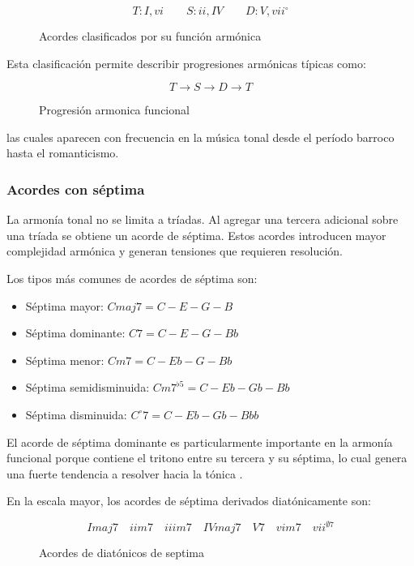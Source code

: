 \documentclass[12pt]{report}
\begin{document}
\begin{figure}[h]
\centering
\[
T: I, vi \qquad S: ii, IV \qquad D: V, vii^\circ
\]
\caption{Acordes clasificados por su función armónica \cite{harrison1994harmonic}}
\end{figure}


Esta clasificación permite describir progresiones armónicas típicas como:

\begin{figure}[h]
\centering
\[
T \rightarrow S \rightarrow D \rightarrow T
\]
\caption{Progresión armonica funcional \cite{rohrmeier2011generative}}
\end{figure}

las cuales aparecen con frecuencia en la música tonal desde el período barroco hasta el romanticismo.

\subsubsection{Acordes con séptima}

La armonía tonal no se limita a tríadas. Al agregar una tercera adicional sobre una tríada se obtiene un acorde de séptima. Estos acordes introducen mayor complejidad armónica y generan tensiones que requieren resolución.

Los tipos más comunes de acordes de séptima son:

\begin{itemize}
\item Séptima mayor: $Cmaj7 = C - E - G - B$
\item Séptima dominante: $C7 = C - E - G - Bb$
\item Séptima menor: $Cm7 = C - Eb - G - Bb$
\item Séptima semidisminuida: $Cm7^{\flat5} = C - Eb - Gb - Bb$
\item Séptima disminuida: $C^\circ7 = C - Eb - Gb - Bbb$
\end{itemize}

El acorde de séptima dominante es particularmente importante en la armonía funcional porque contiene el tritono entre su tercera y su séptima, lo cual genera una fuerte tendencia a resolver hacia la tónica \cite{schoenberg1983theory}.


En la escala mayor, los acordes de séptima derivados diatónicamente son:

\begin{figure}[h]
\centering
\[
Imaj7 \quad iim7 \quad iiim7 \quad IVmaj7 \quad V7 \quad vim7 \quad vii^{\emptyset7}
\]
\caption{Acordes de diatónicos de septima \cite{levine2011jazz}}
\end{figure}
\end{document}
